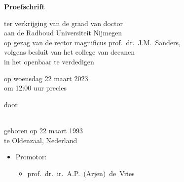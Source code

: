 \begin{titlepage}
	\begin{center}
		\vspace*{3.5cm}
		
		\huge{\bfseries\mytitle}
		
		\vspace*{15pt}
		
		
		\vspace*{5pt}
		
		\normalsize
		
		\vspace{2.0cm}
		
		\textbf{Proefschrift}
		
		\vspace{0.5cm}
		
		ter verkrijging van de graad van doctor\\
		aan de Radboud Universiteit Nijmegen\\
		op gezag van de rector magnificus
		prof.~dr.~J.M.\ Sanders,\\
		volgens besluit van het college van decanen\\
		in het openbaar te verdedigen
		
		\vspace{0.5cm}
		
		op woensdag 22 maart 2023\\
		\vspace{0.2cm}
		om 12:00 uur precies
		
		\vspace{0.5cm}
		
		door
		
		\vspace{0.5cm}
		
		\textbf{\myauthor}\\
		
		geboren op 22 maart 1993\\
		te Oldenzaal, Nederland
	\end{center}
\end{titlepage}

\newpage%

\thispagestyle{empty}

\begin{itemize}
	\item[] Promotor:
	\begin{itemize}
		\item[] prof.\ dr.\ ir.\ A.P.\ (Arjen)\ de\ Vries
	\end{itemize}
\end{itemize}

